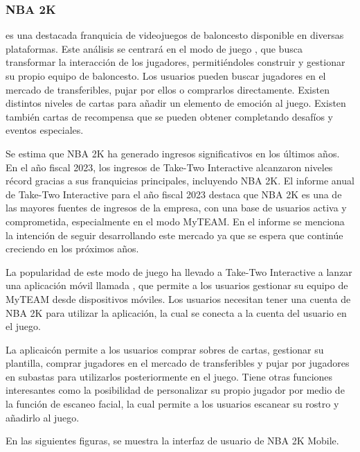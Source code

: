 \subsubsection{NBA 2K}
 es una destacada franquicia de videojuegos de baloncesto disponible en diversas plataformas. 
Este análisis se centrará en el modo de juego , 
que busca transformar la interacción de los jugadores, permitiéndoles construir y gestionar su propio equipo de baloncesto. Los usuarios pueden buscar jugadores en el mercado de transferibles, 
pujar por ellos o comprarlos directamente. Existen distintos niveles de cartas para añadir un elemento de emoción al juego.
Existen también cartas de recompensa que se pueden obtener completando desafíos y eventos especiales.

Se estima que NBA 2K ha generado ingresos significativos en los últimos años. En el año fiscal 2023, 
los ingresos de Take-Two Interactive alcanzaron niveles récord gracias a sus franquicias principales, incluyendo NBA 2K. El informe anual de Take-Two Interactive para el año fiscal 2023\cite{take_two_2023} 
destaca que NBA 2K es una de las mayores fuentes de ingresos de la empresa, con una base de usuarios activa y comprometida, especialmente en el modo MyTEAM. 
En el informe se menciona la intención de seguir desarrollando este mercado ya que se espera que continúe creciendo en los próximos años.

La popularidad de este modo de juego ha llevado a Take-Two Interactive a lanzar una aplicación móvil llamada , 
que permite a los usuarios gestionar su equipo de MyTEAM desde dispositivos móviles. Los usuarios necesitan tener una cuenta de NBA 2K para utilizar la aplicación, 
la cual se conecta a la cuenta del usuario en el juego. 

La aplicaicón permite a los usuarios comprar sobres de cartas, gestionar su plantilla, comprar jugadores en el mercado de transferibles y pujar por jugadores en subastas para utilizarlos posteriormente en el juego.
Tiene otras funciones interesantes como la posibilidad de personalizar su propio jugador por medio de la función de escaneo facial, la cual permite a los usuarios escanear su rostro y añadirlo al juego.

En las siguientes figuras, se muestra la interfaz de usuario de NBA 2K Mobile.


